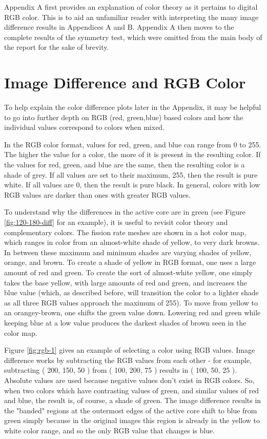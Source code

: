
\label{app}

Appendix A first provides an explanation of color theory as it pertains to digital RGB color.  This is to aid an unfamiliar reader with interpreting the many image difference results in Appendices A and B.  Appendix A then moves to the complete results of the symmetry test, which were omitted from the main body of the report for the sake of brevity. 

\section{Image Difference and RGB Color}
\label{app-rgb}
To help explain the color difference plots later in the Appendix, it may be helpful to go into further depth on RGB (red, green,blue) based colors and how the individual values correspond to colors when mixed.

In the RGB color format, values for red, green, and blue can range from 0 to 255.  The higher the value for a color, the more of it is present in the resulting color.  If the values for red, green, and blue are the same, then the resulting color is a shade of grey.  If all values are set to their maximum, 255, then the result is pure white.  If all values are 0, then the result is pure black.  In general, colors with low RGB values are darker than  ones with greater RGB values.

To understand why the differences in the active core are in green (see Figure \ref{fig:120-180-diff} for an example), it is useful to revisit color theory and complementary colors.  The fission rate meshes are shown in a hot color map, which ranges in color from an almost-white shade of yellow, to very dark browns.  In between these maximum and minimum shades are varying shades of yellow, orange, and brown.  To create a shade of yellow in RGB format, one uses a large amount of red and green.  To create the sort of almost-white yellow, one simply takes the base yellow, with large amounts of red and green, and increases the blue value (which, as described before, will transition the color to a lighter shade as all three RGB values approach the maximum of 255).  To move from yellow to an orangey-brown, one shifts the green value down.  Lowering red and green while keeping blue at a low value produces the darkest shades of brown seen in the color map.



Figure \ref{fig:rgb-1} gives an example of selecting a color using RGB values.  Image difference works by subtracting the RGB values from each other - for example, subtracting ( 200, 150, 50 ) from ( 100, 200, 75 ) results in ( 100, 50, 25 ).  Absolute values are used because negative values don't exist in RGB colors.  So, when  two colors which have contrasting values of green, and similar values of red and blue, the result is, of course, a shade of green.  The image difference results in the "banded" regions at the outermost edges of the active core shift to blue from green simply because in the original images this region is already in the yellow to white color range, and so the only RGB value that changes is blue.


